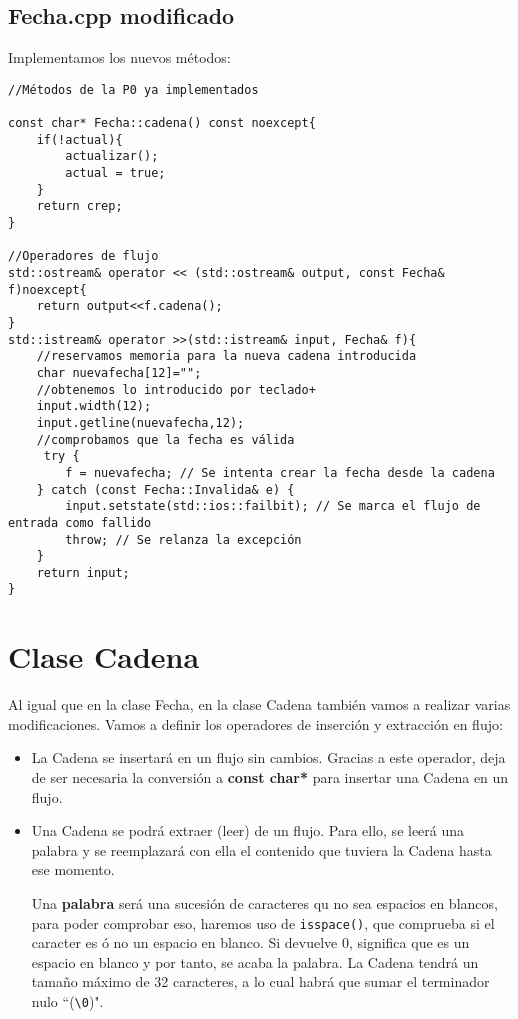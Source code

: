 \subsection{Fecha.cpp modificado}
Implementamos los nuevos métodos:
\begin{verbatim}
//Métodos de la P0 ya implementados

const char* Fecha::cadena() const noexcept{
    if(!actual){
        actualizar();
        actual = true;
    }
    return crep;
}

//Operadores de flujo
std::ostream& operator << (std::ostream& output, const Fecha& f)noexcept{
    return output<<f.cadena();
}
std::istream& operator >>(std::istream& input, Fecha& f){
    //reservamos memoria para la nueva cadena introducida
    char nuevafecha[12]=""; 
    //obtenemos lo introducido por teclado+
    input.width(12);
    input.getline(nuevafecha,12);
    //comprobamos que la fecha es válida
     try {
        f = nuevafecha; // Se intenta crear la fecha desde la cadena
    } catch (const Fecha::Invalida& e) {
        input.setstate(std::ios::failbit); // Se marca el flujo de entrada como fallido
        throw; // Se relanza la excepción
    }
    return input;
}
\end{verbatim}

\newpage
\section{Clase Cadena}
Al igual que en la clase Fecha, en la clase Cadena también vamos a realizar varias modificaciones.
Vamos a definir los operadores de inserción y extracción en flujo:
\begin{itemize}
    \item \textbf{} La Cadena se insertará en un flujo sin 
    cambios. Gracias a este operador, deja de ser necesaria la conversión a \textbf{const char*} 
    para insertar una Cadena en un flujo.
    \item \textbf{} Una Cadena se podrá extraer (leer) de un 
    flujo. Para ello, se leerá una palabra y se reemplazará con ella el contenido que tuviera 
    la Cadena hasta ese momento.

    Una \textbf{palabra} será una sucesión de caracteres qu no sea espacios en blancos, para poder
    comprobar eso, haremos uso de \texttt{isspace()}, que comprueba si el caracter es ó no un espacio
    en blanco. Si devuelve 0, significa que es un espacio en blanco y por tanto, se acaba la palabra.
    La Cadena tendrá un tamaño máximo de 32 caracteres, a lo cual habrá que sumar el terminador nulo ``(\verb|\0|)".
\end{itemize}

